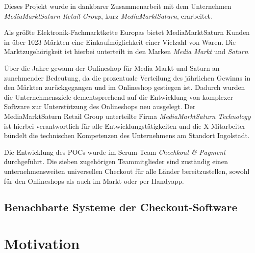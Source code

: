 
Dieses Projekt wurde in dankbarer Zusammenarbeit mit dem Unternehmen \emph{MediaMarktSaturn Retail Group}, kurz \emph{MediaMarktSaturn}, erarbeitet. %

Als größte Elektronik-Fachmarktkette Europas bietet MediaMarktSaturn Kunden in über 1023 Märkten eine Einkaufmöglichkeit einer Vielzahl von Waren. Die Marktzugehörigkeit ist hierbei unterteilt in den Marken \emph{Media Markt} und \emph{Saturn}. %

Über die Jahre gewann der Onlineshop für Media Markt und Saturn an zunehmender Bedeutung, da die prozentuale Verteilung des jährlichen Gewinns in den Märkten zurückgegangen und im Onlineshop gestiegen ist. Dadurch wurden die Unternehmensziele dementsprechend auf die Entwicklung von komplexer Software zur Unterstützung des Onlineshops neu ausgelegt. Der MediaMarktSaturn Retail Group unterteilte Firma \emph{MediaMarktSaturn Technology} ist hierbei verantwortlich für alle Entwicklungstätigkeiten und die {\color{red}X} Mitarbeiter bündelt die technischen Kompetenzen des Unternehmens am Standort Ingolstadt. %

Die Entwicklung des \acrshort{POC}s wurde im \Gls{Scrum}-Team \emph{Chechkout \& Payment} durchgeführt. Die sieben zugehörigen Teammitglieder sind zuständig einen unternehmensweiten universellen Checkout für alle Länder bereitzustellen, sowohl für den Onlineshops als auch im Markt oder per Handyapp. 

\subsection{Benachbarte Systeme der Checkout-Software}

\section{Motivation}


